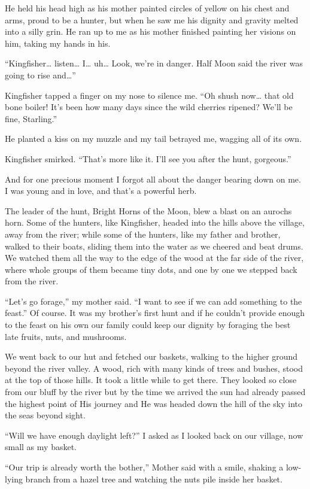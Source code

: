 He held his head high as his mother painted circles of yellow on his chest and arms, proud to be a hunter, but when he saw me his dignity and gravity melted into a silly grin. He ran up to me as his mother finished painting her visions on him, taking my hands in his.

``Kingfisher\ldots{} listen\ldots{} I\ldots{} uh\ldots{} Look, we're in danger. Half Moon said the river was going to rise and\ldots''

Kingfisher tapped a finger on my nose to silence me. ``Oh shush now\ldots{} that old bone boiler! It's been how many days since the wild cherries ripened? We'll be fine, Starling.''

He planted a kiss on my muzzle and my tail betrayed me, wagging all of its own.

Kingfisher smirked. ``That's more like it. I'll see you after the hunt, gorgeous.''

And for one precious moment I forgot all about the danger bearing down on me. I was young and in love, and that's a powerful herb.

The leader of the hunt, Bright Horns of the Moon, blew a blast on an aurochs horn. Some of the hunters, like Kingfisher, headed into the hills above the village, away from the river; while some of the hunters, like my father and brother, walked to their boats, sliding them into the water as we cheered and beat drums. We watched them all the way to the edge of the wood at the far side of the river, where whole groups of them became tiny dots, and one by one we stepped back from the river.

``Let's go forage,'' my mother said. ``I want to see if we can add something to the feast.'' Of course. It was my brother's first hunt and if he couldn't provide enough to the feast on his own our family could keep our dignity by foraging the best late fruits, nuts, and mushrooms.

We went back to our hut and fetched our baskets, walking to the higher ground beyond the river valley. A wood, rich with many kinds of trees and bushes, stood at the top of those hills. It took a little while to get there. They looked so close from our bluff by the river but by the time we arrived the sun had already passed the highest point of His journey and He was headed down the hill of the sky into the seas beyond sight.

``Will we have enough daylight left?'' I asked as I looked back on our village, now small as my basket.

``Our trip is already worth the bother,'' Mother said with a smile, shaking a low-lying branch from a hazel tree and watching the nuts pile inside her basket.

